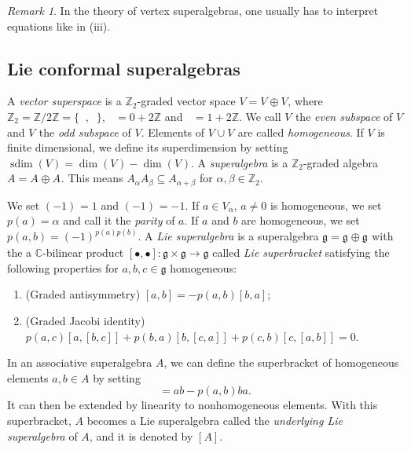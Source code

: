 \documentclass[a4paper, 12pt, reqno]{amsart}
\theoremstyle{remark}
\newtheorem{remark}[theorem]{Remark}
\numberwithin{equation}{subsection}
\DeclareMathOperator{\zero}{\overline{0}}
\DeclareMathOperator{\one}{\overline{1}}
\DeclareMathOperator{\sdim}{sdim}
\begin{document}
\begin{remark}
  \label{rmk:1}
  In the theory of vertex superalgebras, one usually has to interpret equations like in (iii).
\end{remark}

\subsection{Lie conformal superalgebras}
\label{sec:lie-conf-super}

A \emph{vector superspace} is a $\mathbb{Z}_2$-graded vector space $V = V_{\zero} \oplus V_{\one}$, where $\mathbb{Z}_2 = \mathbb{Z}/2\mathbb{Z} = \{\zero, \one\}$, $\zero = 0 + 2\mathbb{Z}$ and $\one = 1 + 2\mathbb{Z}$.
We call $V_{\zero}$ the \emph{even subspace} of $V$ and $V_{\one}$ the \emph{odd subspace} of $V$.
Elements of $V_{\zero} \cup V_{\one}$ are called \emph{homogeneous}.
If $V$ is finite dimensional, we define its superdimension by setting $\sdim(V) = \dim(V_{\zero}) - \dim(V_{\one})$.
A \emph{superalgebra} is a $\mathbb{Z}_2$-graded algebra $A = A_{\zero} \oplus A_{\one}$.
This means $A_{\alpha}A_{\beta} \subseteq A_{\alpha + \beta}$ for $\alpha, \beta \in \mathbb{Z}_2$.

We set $(-1)^{\zero} = 1$ and $(-1)^{\one} = -1$.
If $a \in V_{\alpha}$, $a \neq 0$ is homogeneous, we set $p(a) = \alpha$ and call it the \emph{parity} of $a$.
If $a$ and $b$ are homogeneous, we set $p(a, b) = (-1)^{p(a)p(b)}$.
A \emph{Lie superalgebra} is a superalgebra $\mathfrak{g} = \mathfrak{g}_{\zero} \oplus \mathfrak{g}_{\one}$ with the a $\mathbb{C}$-bilinear product $[\bullet, \bullet]: \mathfrak{g} \times \mathfrak{g} \to \mathfrak{g}$ called \emph{Lie superbracket} satisfying the following properties for $a, b, c \in \mathfrak{g}$ homogeneous:
\begin{enumerate}
\item (Graded antisymmetry) $[a, b] = -p(a, b)[b, a]$;
\item (Graded Jacobi identity) $p(a, c)[a, [b, c]] + p(b, a)[b, [c, a]] + p(c, b)[c, [a, b]] = 0$.
\end{enumerate}

In an associative superalgebra $A$, we can define the superbracket of homogeneous elements $a, b \in A$ by setting
\begin{equation*}
  [a, b] = ab - p(a, b)ba.
\end{equation*}
It can then be extended by linearity to nonhomogeneous elements.
With this superbracket, $A$ becomes a Lie superalgebra called the \emph{underlying Lie superalgebra} of $A$, and it is denoted by $[A]$.
\end{document}
